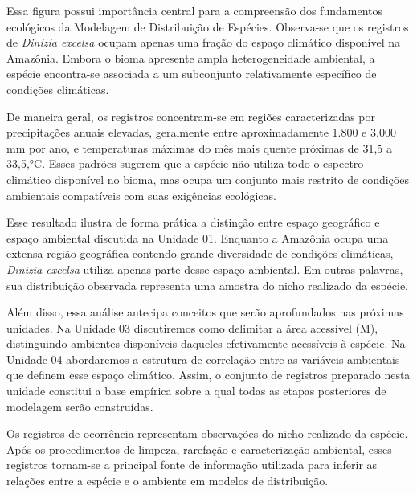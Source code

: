 Essa figura possui importância central para a compreensão dos fundamentos ecológicos da Modelagem de Distribuição de Espécies. Observa-se que os registros de \textit{Dinizia excelsa} ocupam apenas uma fração do espaço climático disponível na Amazônia. Embora o bioma apresente ampla heterogeneidade ambiental, a espécie encontra-se associada a um subconjunto relativamente específico de condições climáticas.

De maneira geral, os registros concentram-se em regiões caracterizadas por precipitações anuais elevadas, geralmente entre aproximadamente 1.800 e 3.000 mm por ano, e temperaturas máximas do mês mais quente próximas de 31,5 a 33,5,°C. Esses padrões sugerem que a espécie não utiliza todo o espectro climático disponível no bioma, mas ocupa um conjunto mais restrito de condições ambientais compatíveis com suas exigências ecológicas.

Esse resultado ilustra de forma prática a distinção entre espaço geográfico e espaço ambiental discutida na Unidade 01. Enquanto a Amazônia ocupa uma extensa região geográfica contendo grande diversidade de condições climáticas, \textit{Dinizia excelsa} utiliza apenas parte desse espaço ambiental. Em outras palavras, sua distribuição observada representa uma amostra do nicho realizado da espécie.

Além disso, essa análise antecipa conceitos que serão aprofundados nas próximas unidades. Na Unidade 03 discutiremos como delimitar a área acessível (M), distinguindo ambientes disponíveis daqueles efetivamente acessíveis à espécie. Na Unidade 04 abordaremos a estrutura de correlação entre as variáveis ambientais que definem esse espaço climático. Assim, o conjunto de registros preparado nesta unidade constitui a base empírica sobre a qual todas as etapas posteriores de modelagem serão construídas.

\begin{conceito}[title={\faBook\quad Integração conceitual}]
	Os registros de ocorrência representam observações do nicho realizado da espécie. Após os procedimentos de limpeza, rarefação e caracterização ambiental, esses registros tornam-se a principal fonte de informação utilizada para inferir as relações entre a espécie e o ambiente em modelos de distribuição.
\end{conceito}


